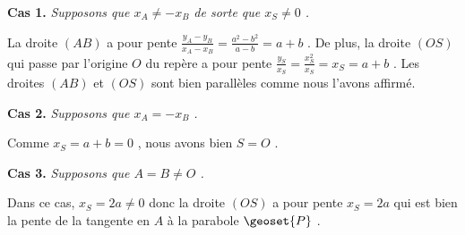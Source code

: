 \textbf{Cas 1.} \emph{Supposons que $x_A \neq - x_B$ de sorte que $x_S \neq 0$ .}

\medskip

La droite $(AB)$ a pour pente
$\frac{y_A - y_B}{x_A - x_B} = \frac{a^2 - b^2}{a - b} = a + b$ .
De plus, la droite $(OS)$ qui passe par l'origine $O$ du repère a pour pente
$\frac{y_S}{x_S} = \frac{x_S^2}{x_S} = x_S = a + b$ .
Les droites $(AB)$ et $(OS)$ sont bien parallèles comme nous l'avons affirmé.


\bigskip

\textbf{Cas 2.} \emph{Supposons que $x_A = - x_B$ .}

\medskip

Comme $x_S = a + b = 0$ , nous avons bien $S = O$ .


\bigskip

\textbf{Cas 3.} \emph{Supposons que $A = B \neq O$ .}

\medskip

Dans ce cas, $x_S = 2a \neq 0$ donc la droite $(OS)$ a pour pente
$x_S = 2a$ qui est bien la pente de la tangente en $A$ à la parabole $\geoset{P}$ .